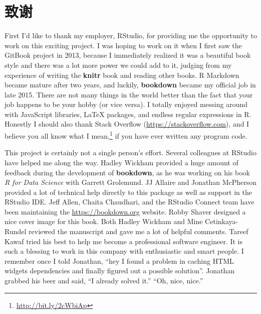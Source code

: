 \documentclass[
  12pt,
]{krantz}
\renewcommand{\href}[2]{#2\footnote{\url{#1}}}
\theoremstyle{definition}
\theoremstyle{definition}
\theoremstyle{definition}
\theoremstyle{definition}
\theoremstyle{remark}
\begin{document}
\section*{致谢}\label{ux81f4ux8c22}


First I'd like to thank my employer, RStudio, for providing me the opportunity to work on this exciting project. I was hoping to work on it when I first saw the GitBook project in 2013, because I immediately realized it was a beautiful book style and there was a lot more power we could add to it, judging from my experience of writing the \textbf{knitr} book \citep{xie2015} and reading other books. R Markdown became mature after two years, and luckily, \textbf{bookdown} became my official job in late 2015. There are not many things in the world better than the fact that your job happens to be your hobby (or vice versa). I totally enjoyed messing around with JavaScript libraries, LaTeX packages, and endless regular expressions in R. Honestly I should also thank Stack Overflow (\url{https://stackoverflow.com}), and I believe you all know \href{http://bit.ly/2cWbiAp}{what I mean,} if you have ever written any program code.

This project is certainly not a single person's effort. Several colleagues at RStudio have helped me along the way. Hadley Wickham provided a huge amount of feedback during the development of \textbf{bookdown}, as he was working on his book \emph{R for Data Science} with Garrett Grolemund. JJ Allaire and Jonathan McPherson provided a lot of technical help directly to this package as well as support in the RStudio IDE. Jeff Allen, Chaita Chaudhari, and the RStudio Connect team have been maintaining the \url{https://bookdown.org} website. Robby Shaver designed a nice cover image for this book. Both Hadley Wickham and Mine Cetinkaya-Rundel reviewed the manuscript and gave me a lot of helpful comments. Tareef Kawaf tried his best to help me become a professional software engineer. It is such a blessing to work in this company with enthusiastic and smart people. I remember once I told Jonathan, ``hey I found a problem in caching HTML widgets dependencies and finally figured out a possible solution''. Jonathan grabbed his beer and said, ``I already solved it.'' ``Oh, nice, nice.''
\end{document}

